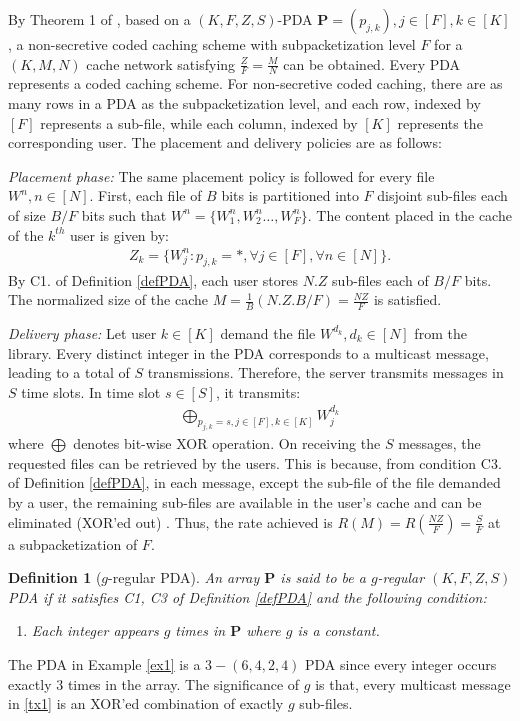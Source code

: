 \documentclass[conference]{IEEEtran}
\newtheorem{defn}{Definition}
\begin{document}
\par By Theorem 1 of \cite{PDAmain}, based on a $(K,F,Z,S)$-PDA $\mathbf{P}=(p_{j,k}), j\in[F], k\in[K]$, a non-secretive coded caching scheme with subpacketization level $F$ for a $(K,M,N)$ cache network satisfying $\frac{Z}{F}=\frac{M}{N}$ can be obtained. Every PDA represents a coded caching scheme. For non-secretive coded caching, there are as many rows in a PDA as the subpacketization level, and each row, indexed by $[F]$ represents a sub-file, while each column, indexed by $[K]$ represents the corresponding user. The placement and delivery policies are as follows:
	\par\emph{Placement phase:} The same placement policy is followed for every file $W^n,n\in[N]$. First, each file of $B$ bits is partitioned into $F$ disjoint sub-files each of size $B/F$ bits such that $W^n=\{W^n_1,W^n_2\ldots,W^n_F\}$. The content placed in the cache of the $k^{th}$ user is given by:
	\begin{align}
	    \label{plcmnt}
	    Z_k=\big\{W^n_j:p_{j,k}=*,\forall j\in[F],\forall n\in [N]\big\}.
	\end{align}
	By C1. of Definition \ref{defPDA}, each user stores $N.Z$ sub-files each of $B/F$ bits. The normalized size of the cache $M=\frac{1}{B}(N.Z.B/F)=\frac{NZ}{F}$ is satisfied.
	\par \emph{Delivery phase:} Let user $k\in [K]$ demand the file $W^{d_k},d_k\in [N]$ from the library. Every distinct integer in the PDA corresponds to a multicast message, leading to a total of $S$ transmissions. Therefore, the server transmits messages in $S$ time slots.  In time slot $s\in [S]$, it transmits:
	\begin{align}\label{tx1}
	   \bigoplus_{p_{j,k}=s,j\in[F],k\in[K]}W^{d_k}_j 
	\end{align}
	where $\bigoplus$ denotes bit-wise XOR operation. On receiving the $S$ messages, the requested files can be retrieved by the users. This is because, from condition C3. of Definition \ref{defPDA}, in each message, except the sub-file of the file demanded by a user, the remaining sub-files are available in the user's cache and can be eliminated (XOR'ed out) \cite{PDAmain}. Thus, the rate achieved is $R(M)=R(\frac{NZ}{F})=\frac{S}{F}$ at a subpacketization of $F$.
\begin{defn}[$g$-regular PDA\cite{PDAmain}]
	An array $\mathbf{P}$ is said to be a $g$-regular $(K,F,Z,S)$ PDA if it satisfies C1, C3 of Definition \ref{defPDA} and the following condition:
	\begin{enumerate}[C2'.]
		\item Each integer appears $g$ times in $\mathbf{P}$ where $g$ is a constant.
	\end{enumerate}
\end{defn}
The PDA in Example \ref{ex1} is a  $3-(6,4,2,4)$ PDA since every integer occurs exactly $3$ times in the array. The significance of $g$ is that, every multicast message in \eqref{tx1} is an XOR'ed combination of exactly $g$ sub-files.
\end{document}

